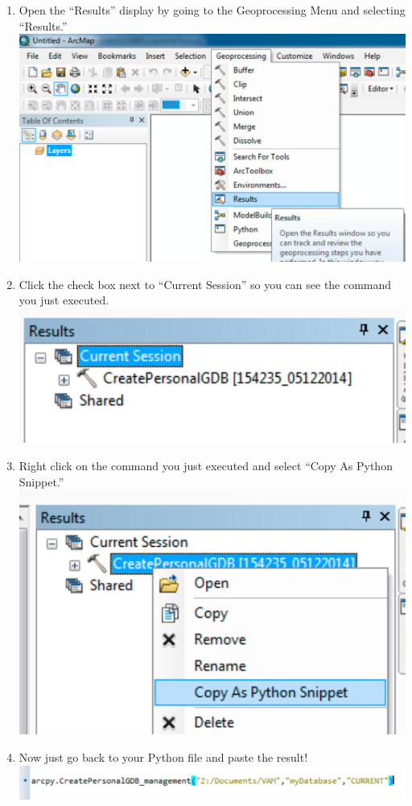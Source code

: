 \documentclass[12pt]{article}
\begin{document}
\begin{enumerate}
	\item Open the ``Results'' display by going to the Geoprocessing Menu and selecting ``Results.'' \\
	\includegraphics[scale=.4]{figures/resultsMenu.pdf}  
	\item Click the check box next to ``Current Session'' so you can see the command you just executed. \\
	\includegraphics[scale=0.8]{figures/results2.pdf} \\
	\item Right click on the command you just executed and select ``Copy As Python Snippet.'' \\
	\includegraphics[scale=0.8]{figures/results3.pdf} \\
	\item Now just go back to your Python file and paste the result! \\
	\includegraphics[scale=0.8]{figures/paste1.pdf}
\end{enumerate}
\end{document}
